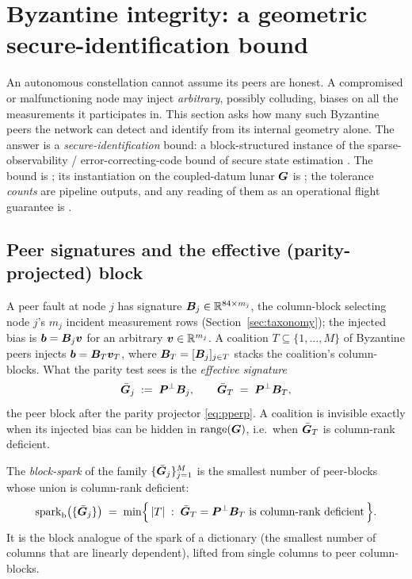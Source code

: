\section{Byzantine integrity: a geometric secure-identification bound}
\label{sec:byzantine}

An autonomous constellation cannot assume its peers are honest. A compromised or
malfunctioning node may inject \emph{arbitrary}, possibly colluding, biases on all the
measurements it participates in. This section asks how many such Byzantine peers the network
can detect and identify from its internal geometry alone. The answer is a
\emph{secure-identification} bound: a block-structured instance of the sparse-observability /
error-correcting-code bound of secure state estimation \citep{fawzi2014,shoukry2016,%
candes2005,donoho2003}. The bound is \Cited{}; its instantiation on the coupled-datum lunar
$\bm{G}$ is \Proven{}; the tolerance \emph{counts} are \Validated{} pipeline outputs, and any
reading of them as an operational flight guarantee is \Modelled{}.

\subsection{Peer signatures and the effective (parity-projected) block}
\label{sec:peersig}

A peer fault at node $j$ has signature $\bm{B}_j\in\mathbb{R}^{84\times m_j}$, the column-block
selecting node $j$'s $m_j$ incident measurement rows (Section~\ref{sec:taxonomy}); the
injected bias is $\bm{b}=\bm{B}_j\bm v$ for an arbitrary $\bm v\in\mathbb{R}^{m_j}$. A coalition
$T\subseteq\{1,\dots,M\}$ of Byzantine peers injects $\bm{b}=\bm{B}_T\bm v_T$, where
$\bm{B}_T=[\bm{B}_j]_{j\in T}$ stacks the coalition's column-blocks. What the parity test sees
is the \emph{effective signature}
\begin{equation}
  \bar{\bm{G}}_j \;:=\; \bm{P}^{\perp}\bm{B}_j,
  \qquad
  \bar{\bm{G}}_T \;=\; \bm{P}^{\perp}\bm{B}_T ,
  \label{eq:effsig}
\end{equation}
the peer block after the parity projector \eqref{eq:pperp}. A coalition is invisible exactly
when its injected bias can be hidden in $\operatorname{range}(\bm{G})$, i.e.\ when $\bar{\bm{G}}_T$ is column-rank
deficient.

\begin{definition}
\label{def:blockspark}
The \emph{block-spark} of the family $\{\bar{\bm{G}}_j\}_{j=1}^{M}$ is the smallest number of
peer-blocks whose union is column-rank deficient:
\begin{equation}
  \operatorname{spark}_{\mathrm b}\bigl(\{\bar{\bm{G}}_j\}\bigr)
  \;=\;\min\Bigl\{\,|T|\;:\;\bar{\bm{G}}_T=\bm{P}^{\perp}\bm{B}_T\ \text{is column-rank deficient}\,\Bigr\}.
  \label{eq:blockspark}
\end{equation}
It is the block analogue of the spark of a dictionary \citep{donoho2003} (the smallest number
of columns that are linearly dependent), lifted from single columns to peer column-blocks.
\end{definition}

